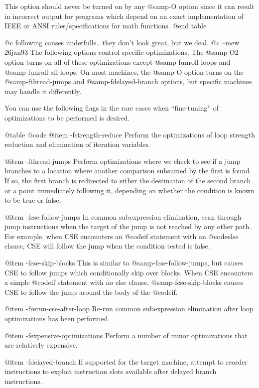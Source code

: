 {This option should never be turned on by any @samp{-O} option since 
it can result in incorrect output for programs which depend on 
an exact implementation of IEEE or ANSI rules/specifications for
math functions.
@end table

@c following causes underfulls.. they don't look great, but we deal.
@c --mew 26jan93
The following options control specific optimizations.  The @samp{-O2}
option turns on all of these optimizations except @samp{-funroll-loops}
and @samp{-funroll-all-loops}.  On most machines, the @samp{-O} option
turns on the @samp{-fthread-jumps} and @samp{-fdelayed-branch} options,
but specific machines may handle it differently.

You can use the following flags in the rare cases when ``fine-tuning''
of optimizations to be performed is desired.

@table @code
@item -fstrength-reduce
Perform the optimizations of loop strength reduction and
elimination of iteration variables.

@item -fthread-jumps
Perform optimizations where we check to see if a jump branches to a
location where another comparison subsumed by the first is found.  If
so, the first branch is redirected to either the destination of the
second branch or a point immediately following it, depending on whether
the condition is known to be true or false.

@item -fcse-follow-jumps
In common subexpression elimination, scan through jump instructions
when the target of the jump is not reached by any other path.  For
example, when CSE encounters an @code{if} statement with an
@code{else} clause, CSE will follow the jump when the condition
tested is false.

@item -fcse-skip-blocks
This is similar to @samp{-fcse-follow-jumps}, but causes CSE to
follow jumps which conditionally skip over blocks.  When CSE
encounters a simple @code{if} statement with no else clause,
@samp{-fcse-skip-blocks} causes CSE to follow the jump around the
body of the @code{if}.

@item -frerun-cse-after-loop
Re-run common subexpression elimination after loop optimizations has been
performed.  

@item -fexpensive-optimizations
Perform a number of minor optimizations that are relatively expensive.

@item -fdelayed-branch
If supported for the target machine, attempt to reorder instructions
to exploit instruction slots available after delayed branch
instructions.

}
